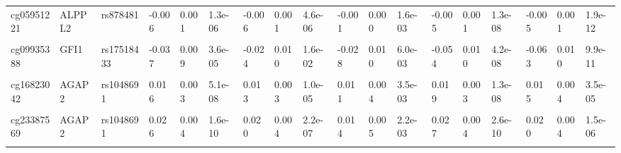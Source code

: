 \documentclass[11pt,twoside]{bristolthesis}
\begin{document}
\begin{landscape}
\begin{table}[!h]
{\begin{tabular}[t]{llllllllllllllllll}
\addlinespace
cg05951221 & ALPPL2 & rs878481 & -0.006 & 0.001 & 1.3e-06 & -0.006 & 0.001 & 4.6e-06 & -0.001 & 0.000 & 1.6e-03 & -0.005 & 0.001 & 1.3e-08 & -0.005 & 0.001 & 1.9e-12\\
\cellcolor{gray!6}{cg08709672} & \cellcolor{gray!6}{AVPR1B} & \cellcolor{gray!6}{rs77433148} & \cellcolor{gray!6}{-0.014} & \cellcolor{gray!6}{0.008} & \cellcolor{gray!6}{9.1e-02} & \cellcolor{gray!6}{-0.004} & \cellcolor{gray!6}{0.008} & \cellcolor{gray!6}{6.2e-01} & \cellcolor{gray!6}{0.010} & \cellcolor{gray!6}{0.008} & \cellcolor{gray!6}{2.3e-01} & \cellcolor{gray!6}{-0.032} & \cellcolor{gray!6}{0.006} & \cellcolor{gray!6}{6.9e-07} & \cellcolor{gray!6}{0.002} & \cellcolor{gray!6}{0.007} & \cellcolor{gray!6}{8.2e-01}\\
cg09935388 & GFI1 & rs17518433 & -0.037 & 0.009 & 3.6e-05 & -0.024 & 0.010 & 1.6e-02 & -0.028 & 0.010 & 6.0e-03 & -0.054 & 0.010 & 4.2e-08 & -0.063 & 0.010 & 9.9e-11\\
\cellcolor{gray!6}{cg11660018} & \cellcolor{gray!6}{PRSS23} & \cellcolor{gray!6}{rs1939110} & \cellcolor{gray!6}{-0.017} & \cellcolor{gray!6}{0.003} & \cellcolor{gray!6}{6.5e-10} & \cellcolor{gray!6}{-0.014} & \cellcolor{gray!6}{0.003} & \cellcolor{gray!6}{1.2e-05} & \cellcolor{gray!6}{-0.004} & \cellcolor{gray!6}{0.003} & \cellcolor{gray!6}{1.9e-01} & \cellcolor{gray!6}{-0.014} & \cellcolor{gray!6}{0.003} & \cellcolor{gray!6}{8.0e-07} & \cellcolor{gray!6}{-0.012} & \cellcolor{gray!6}{0.003} & \cellcolor{gray!6}{1.0e-05}\\
cg16823042 & AGAP2 & rs1048691 & 0.016 & 0.003 & 5.1e-08 & 0.013 & 0.003 & 1.0e-05 & 0.011 & 0.004 & 3.5e-03 & 0.019 & 0.003 & 1.3e-08 & 0.015 & 0.004 & 3.5e-05\\
\addlinespace
\cellcolor{gray!6}{cg21566642} & \cellcolor{gray!6}{ALPPL2} & \cellcolor{gray!6}{rs3748971} & \cellcolor{gray!6}{-0.009} & \cellcolor{gray!6}{0.006} & \cellcolor{gray!6}{1.6e-01} & \cellcolor{gray!6}{-0.011} & \cellcolor{gray!6}{0.006} & \cellcolor{gray!6}{6.9e-02} & \cellcolor{gray!6}{-0.007} & \cellcolor{gray!6}{0.003} & \cellcolor{gray!6}{6.2e-03} & \cellcolor{gray!6}{-0.034} & \cellcolor{gray!6}{0.004} & \cellcolor{gray!6}{9.2e-15} & \cellcolor{gray!6}{-0.024} & \cellcolor{gray!6}{0.004} & \cellcolor{gray!6}{2.4e-08}\\
cg23387569 & AGAP2 & rs1048691 & 0.026 & 0.004 & 1.6e-10 & 0.020 & 0.004 & 2.2e-07 & 0.014 & 0.005 & 2.2e-03 & 0.027 & 0.004 & 2.6e-10 & 0.020 & 0.004 & 1.5e-06\\
\cellcolor{gray!6}{cg23771366} & \cellcolor{gray!6}{PRSS23} & \cellcolor{gray!6}{rs72967500} & \cellcolor{gray!6}{-0.010} & \cellcolor{gray!6}{0.002} & \cellcolor{gray!6}{2.4e-06} & \cellcolor{gray!6}{-0.014} & \cellcolor{gray!6}{0.003} & \cellcolor{gray!6}{6.7e-07} & \cellcolor{gray!6}{-0.010} & \cellcolor{gray!6}{0.001} & \cellcolor{gray!6}{1.8e-16} & \cellcolor{gray!6}{-0.011} & \cellcolor{gray!6}{0.001} & \cellcolor{gray!6}{2.1e-13} & \cellcolor{gray!6}{-0.012} & \cellcolor{gray!6}{0.002} & \cellcolor{gray!6}{1.3e-12}\\

\end{tabular}}
\end{table}
\end{landscape}
\end{document}
